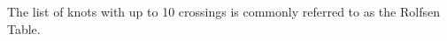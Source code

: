 
\theorems

\begin{paperabstract}
The list of knots with up to 10 crossings is commonly referred to as the Rolfsen
Table.
\end{paperabstract}
\begin{paper}
\end{paper}

